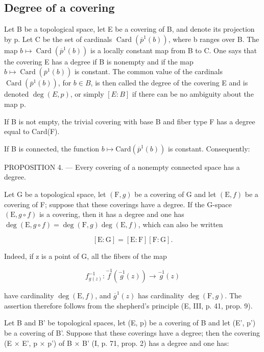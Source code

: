 \subsection{Degree of a covering}

Let B be a topological space, let E be a covering of B, and denote its projection by p. Let C be the set of cardinals \(\operatorname{Card}(\overline{p}^{1}(b))\), where b ranges over B. The map \(b \mapsto \operatorname{Card}(\overline{p}^{1}(b))\) is a locally constant map from B to C. One says that the covering E has a degree if B is nonempty and if the map \(b \mapsto \operatorname{Card}(\overline{p}^{1}(b))\) is constant. The common value of the cardinals \(\operatorname{Card}(\overline{p}^{1}(b))\), for \(b \in B\), is then called the degree of the covering E and is denoted \(\deg(E, p)\), or simply \([E:B]\) if there can be no ambiguity about the map p.

If B is not empty, the trivial covering with base B and fiber type F has a degree equal to Card(F).

If B is connected, the function \(b \mapsto \text{Card}(\overline{p}^{1}(b))\) is constant. Consequently:

PROPOSITION 4. --- Every covering of a nonempty connected space has a degree.

Let G be a topological space, let \((\mathrm{F}, g)\) be a covering of G and let \((\mathrm{E}, f)\) be a covering of F; suppose that these coverings have a degree. If the G-space \((\mathrm{E}, g \circ f)\) is a covering, then it has a degree and one has \(\deg(\mathrm{E}, g \circ f) = \deg(\mathrm{F}, g) \deg(\mathrm{E}, f)\), which can also be written

\[
[ \mathrm{E}: \mathrm{G} ] = [ \mathrm{E}: \mathrm{F} ] [ \mathrm{F}: \mathrm{G} ].
\]

Indeed, if z is a point of G, all the fibers of the map

\[
f _ {g (z)} ^ {- 1}: \stackrel {{- 1}} {{f}} (\stackrel {{- 1}} {{g}} (z)) \to \stackrel {{- 1}} {{g}} (z)
\]

have cardinality \(\deg(\mathrm{E}, f)\), and \(\overline{g}^1(z)\) has cardinality \(\deg(\mathrm{F}, g)\). The assertion therefore follows from the shepherd's principle (E, III, p. 41, prop. 9).

Let B and B' be topological spaces, let (E, p) be a covering of B and let (E', p') be a covering of B'. Suppose that these coverings have a degree; then the covering (E × E', p × p') of B × B' (I, p. 71, prop. 2) has a degree and one has:

